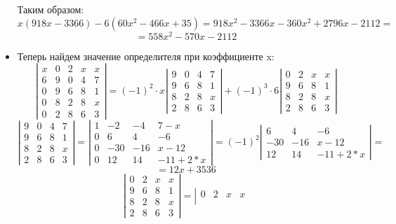 \documentclass[a4paper,12pt]{article}
\begin{document}
\begin{itemize}
Таким образом:
\[
x(918x-3366) -6(60x^2 - 466x + 35) = 918x^2 - 3366x - 360x^2 + 2796x - 2112 =
\]
\[
= 558x^2 - 570x - 2112
\]
\item Теперь найдем значение определителя при коэффициенте x:
\[
\left|\begin{matrix}
x & 0 & 2 & x & x \\
6 & 9 & 0 & 4 & 7 \\
0 & 9 & 6 & 8 & 1 \\
0 & 8 & 2 & 8 & x \\
0 & 2 & 8 & 6 & 3
\end{matrix}\right| = (-1)^2 \cdot x \left|\begin{matrix}
9 & 0 & 4 & 7 \\
9 & 6 & 8 & 1 \\
8 & 2 & 8 & x \\
2 & 8 & 6 & 3
\end{matrix}\right| + (-1)^3 \cdot 6  \left|\begin{matrix}
0 & 2 & x & x \\
9 & 6 & 8 & 1 \\
8 & 2 & 8 & x \\
2 & 8 & 6 & 3
\end{matrix}\right|
\]
\[
\left|\begin{matrix}
9 & 0 & 4 & 7 \\
9 & 6 & 8 & 1 \\
8 & 2 & 8 & x \\
2 & 8 & 6 & 3
\end{matrix}\right| = 
\left|\begin{matrix}
1 & -2 & -4 & 7-x \\
0 & 6 & 4 & -6 \\
0 & -30 & -16 & x-12 \\
0 & 12 & 14 & -11+2*x
\end{matrix}\right| = (-1)^2\left|\begin{matrix}
6 & 4 & -6 \\
-30 & -16 & x-12 \\
12 & 14 & -11+2*x
\end{matrix}\right| = 
\]
\[
= 12x+3536
\]
\[
\left|\begin{matrix}
0 & 2 & x & x \\
9 & 6 & 8 & 1 \\
8 & 2 & 8 & x \\
2 & 8 & 6 & 3
\end{matrix}\right|
=
\left|\begin{matrix}
0 & 2 & x & x \\

\end{matrix}\]
\end{itemize}
\end{document}
